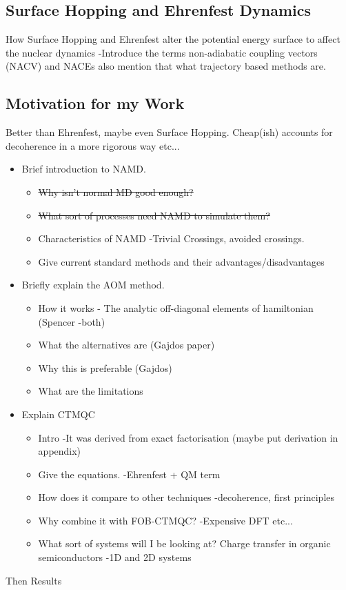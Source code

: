 \subsection{Surface Hopping and Ehrenfest Dynamics}
{\LARGE How Surface Hopping and Ehrenfest alter the potential energy surface to affect the nuclear dynamics -Introduce the terms non-adiabatic coupling vectors (NACV) and NACEs also mention that what trajectory based methods are.}
\subsection{Motivation for my Work}
{\Large Better than Ehrenfest, maybe even Surface Hopping. Cheap(ish) accounts for decoherence in a more rigorous way etc...}
\newpage



\begin{itemize}
\item Brief introduction to NAMD.
\begin{itemize}
\item \st{Why isn't normal MD good enough?}
\item \st{What sort of processes need NAMD to simulate them?}
\item Characteristics of NAMD -Trivial Crossings, avoided crossings.
\item Give current standard methods and their advantages/disadvantages
\end{itemize}
\item Briefly explain the AOM method.
\begin{itemize}
\item How it works - The analytic off-diagonal elements of hamiltonian (Spencer -both)
\item What the alternatives are (Gajdos paper)
\item Why this is preferable (Gajdos)
\item What are the limitations
\end{itemize}
\item Explain CTMQC
\begin{itemize}
\item Intro -It was derived from exact factorisation (maybe put derivation in appendix)
\item Give the equations. -Ehrenfest + QM term
\item How does it compare to other techniques -decoherence, first principles
\item Why combine it with FOB-CTMQC? -Expensive DFT etc...
\item What sort of systems will I be looking at? Charge transfer in organic semiconductors -1D and 2D systems
\end{itemize}

\end{itemize}
Then Results
